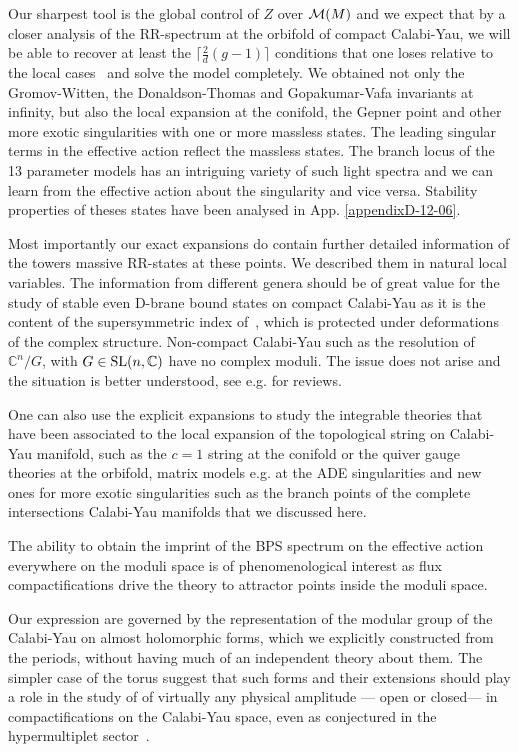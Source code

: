 \documentclass[12pt]{article}
\begin{document}
Our sharpest tool is the global control of $Z$ over ${\cal
M}(M)$ and we  expect that by a closer analysis of the RR-spectrum
at the orbifold of compact Calabi-Yau, we will be able to recover
at least the $\lceil \frac{2}{d}(g-1)\rceil$ conditions that one
loses relative to the local cases~\cite{Huang2} and solve the
model completely. We obtained not only the Gromov-Witten, the
Donaldson-Thomas and Gopakumar-Vafa invariants at infinity, but
also the local expansion at the conifold, the Gepner point and
other more exotic singularities with one or more massless states.
The leading singular terms in the effective action reflect the
massless states. The branch locus of the 13 parameter 
models has an intriguing variety of such light spectra and 
we can learn from the effective action about the singularity 
and vice versa. Stability properties of theses states have 
been analysed in App. \ref{appendixD-12-06}.


Most importantly our exact expansions do contain further
detailed information of the towers massive RR-states at these
points. We described them in natural local variables. The 
information from different genera should be of great value for the
study of stable even D-brane bound states on compact Calabi-Yau as
it is the content of the supersymmetric index of~\cite{GVII},
which is protected under deformations of the complex structure.
Non-compact Calabi-Yau such as the resolution of
$\mathbb{C}^n/G$, with $G\in {\rm SL}(n,\mathbb{C})$ have
no complex moduli. The issue does not arise and the situation is
better understood, see e.g. \cite{Bridgeland,Aspinwall} for reviews.

One can also use the  explicit expansions  to study  the
integrable theories that have been associated to the local
expansion of the topological string on Calabi-Yau manifold, such
as the $c=1$ string at the conifold or the quiver gauge theories
at the orbifold, matrix models e.g. at the ADE singularities and new 
ones for more exotic singularities such as the  
branch points of the complete intersections Calabi-Yau 
manifolds that we discussed here.


The ability to obtain the imprint of the BPS spectrum on the
effective action everywhere on the moduli space is of
phenomenological interest as flux compactifications drive the
theory to attractor points inside the moduli space.

Our expression are governed by the representation of the modular
group of the Calabi-Yau on almost holomorphic forms, which we
explicitly constructed from the periods, without having much of an
independent theory about them. The simpler case of the torus
suggest that such forms and their extensions should play a role
in the study of of virtually any physical amplitude --- open or closed--- 
in compactifications on the Calabi-Yau space, even as conjectured 
in the hypermultiplet sector~\cite{Rocek:2005ij}.
\end{document}
